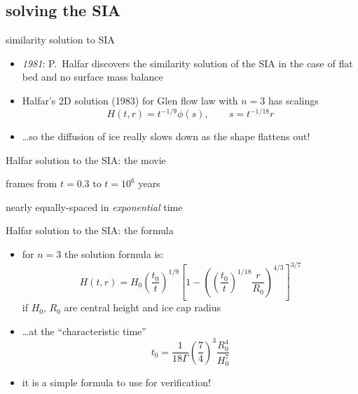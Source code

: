 \subsection{solving the SIA}

\begin{frame}{similarity solution to SIA}

\begin{itemize}
\item \emph{1981}:  P.~Halfar discovers the similarity solution of the SIA in the case of flat bed and no surface mass balance
\item Halfar's 2D solution (1983) for Glen flow law with $n=3$ has scalings
   $$H(t,r)=t^{-1/9} \phi(s), \qquad s = t^{-1/18} r$$
\item \dots so the diffusion of ice really slows down as the shape flattens out!
\end{itemize}
\end{frame}


\begin{frame}{Halfar solution to the SIA: the movie}
\label{slide:plothalfar}

\medskip
\small
frames from $t=0.3$ to $t = 10^6$ years

\medskip
nearly equally-spaced in \emph{exponential} time

\begin{center}
\end{center}
\end{frame}


\begin{frame}{Halfar solution to the SIA: the formula}

\begin{itemize}
\item for $n=3$ the solution formula is:
  $$H(t,r) = H_0 \left(\frac{t_0}{t}\right)^{1/9} \left[1 - \left(\left(\frac{t_0}{t}\right)^{1/18} \frac{r}{R_0}\right)^{4/3}\right]^{3/7}$$
if $H_0$, $R_0$ are central height and ice cap radius
\item \dots at the ``characteristic time''
  $$t_0 = \frac{1}{18 \Gamma} \left(\frac{7}{4}\right)^3 \frac{R_0^4}{H_0^{7}}$$
\item it is a simple formula to use for verification!
\end{itemize}
\end{frame}


